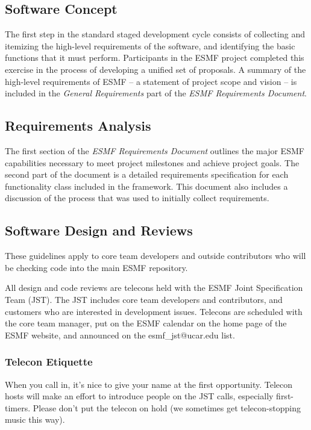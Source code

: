 \subsection{Software Concept}

The first step in the standard staged development cycle consists of 
collecting and itemizing the high-level requirements of the software, and 
identifying the basic functions that it must perform.  Participants in
the ESMF project completed this exercise in the process of developing
a unified set of proposals.  A summary of the high-level requirements
of ESMF -- a statement of project scope and vision -- is included 
in the {\it General Requirements} part of the {\it ESMF Requirements Document}\cite{bib:ESMFreqdoc}.

\subsection {Requirements Analysis}

The first section of the {\it ESMF Requirements Document} outlines 
the major ESMF capabilities necessary to meet project milestones and achieve 
project goals.  The second part of the document is a detailed 
requirements specification for each functionality class included in 
the framework.  This document also includes a discussion of the 
process that was used to initially collect requirements.

\subsection{Software Design and Reviews}

These guidelines apply to core team developers and outside contributors
who will be checking code into the main ESMF repository.

All design and code reviews are telecons held with the ESMF Joint
Specification Team (JST). The JST includes core team developers and
contributors, and customers who are interested in development issues.
Telecons are scheduled with the core team manager, put on the ESMF
calendar on the home page of the ESMF website, and announced on the
esmf\_jst@ucar.edu list.

\subsubsection{Telecon Etiquette}

When you call in, it's nice to give your name at the first opportunity.
Telecon hosts will make an effort to introduce people on the JST calls,
especially first-timers. Please don't put the telecon on hold (we sometimes
get telecon-stopping music this way).


